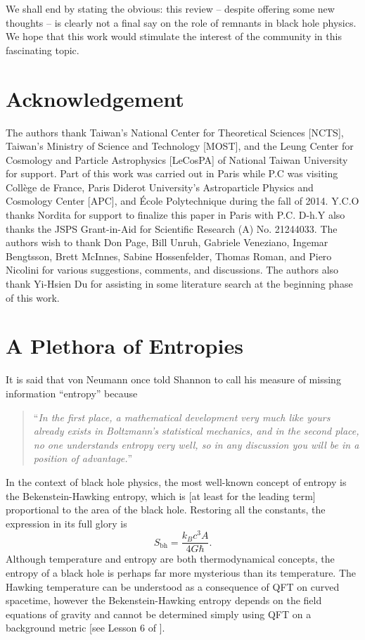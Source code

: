 \documentclass[12pt]{article}
\newcommand{\2}{$^2$}
\newcommand{\3}{$^3$}
\newcommand{\4}{$_4$}
\newcommand{\5}{$_5$}
\begin{document}
We shall end by stating the obvious: this review -- despite offering some new thoughts -- is clearly not a final say on the role of remnants in black hole physics. We hope that this work would stimulate the interest of the community in this fascinating topic. 





\section*{Acknowledgement}
The authors thank Taiwan's National Center for Theoretical Sciences [NCTS], Taiwan's Ministry of Science and Technology [MOST], and the Leung Center for Cosmology and Particle Astrophysics [LeCosPA] of National Taiwan University for support. Part of this work was carried out in Paris while P.C was visiting Coll\`ege de France, Paris Diderot University's Astroparticle Physics and Cosmology Center [APC], and \'Ecole Polytechnique during the fall of 2014. Y.C.O thanks Nordita for support to finalize this paper in Paris with P.C. D-h.Y also thanks the JSPS Grant-in-Aid for Scientific Research (A) No. 21244033. The authors wish to thank Don Page, Bill Unruh, Gabriele Veneziano, Ingemar Bengtsson, Brett McInnes, Sabine Hossenfelder, Thomas Roman, and Piero Nicolini for various suggestions, comments, and discussions. The authors also thank Yi-Hsien Du for assisting in some literature search at the beginning phase of this work. 

\appendix

\section{A Plethora of Entropies}\label{A}

It is said that von Neumann once told Shannon to call his measure of missing information ``entropy'' because \cite{avery}
\begin{quote}``\emph{In the first place, a mathematical development very much like yours already exists in Boltzmann's statistical mechanics, and in the second place, no one understands entropy very well, so in any discussion you will be in a position of advantage.}''
\end{quote}


In the context of black hole physics, the most well-known concept of entropy is the Bekenstein-Hawking entropy, which is [at least for the leading term] proportional to the area of the black hole. Restoring all the constants, the expression in its full glory is
\begin{equation}
S_{\text{bh}}=\frac{k_B c^3A}{4G\hbar}.
\end{equation}
Although temperature and entropy are both thermodynamical concepts, the entropy of a black hole is perhaps far more mysterious than its temperature. The Hawking temperature can be understood as a consequence of QFT on curved spacetime, however the Bekenstein-Hawking entropy depends on the field equations of gravity and cannot be determined simply using QFT on a background metric [see Lesson 6 of \cite{Pad}].
\end{document}
